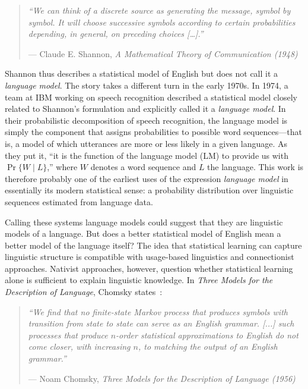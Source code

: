 \begin{quote}
    \small\itshape
    ``We can think of a discrete source as generating the message, symbol by symbol.
    It will choose successive symbols according to certain probabilities depending,
    in general, on preceding choices [\ldots{}].''

    \begin{flushright}
    \normalfont--- Claude E. Shannon, \textit{A Mathematical Theory of Communication (1948)}
    \end{flushright}
\end{quote}
Shannon thus describes a statistical
model of English but does not call it a \textit{language model}.
The story takes a different turn in the early 1970s. In 1974, a team at IBM working 
on speech recognition described a statistical model closely related to Shannon's formulation and explicitly 
called it a \textit{language model}. In their probabilistic decomposition of speech recognition, 
the language model is simply the component that assigns probabilities to possible 
word sequences---that is, a model of which utterances are more or less likely in a given language. 
As they put it, ``it is the function of the language model (LM) to provide us with $\Pr\{W \mid L\}$,'' 
where $W$ denotes a word sequence and $L$ the language. 
This work is therefore probably one of the earliest uses of the expression \textit{language model} 
in essentially its modern statistical sense: a probability distribution over linguistic sequences 
estimated from language data.

Calling these systems language models could suggest that they are
linguistic models of a language. But does a better statistical model of English mean a better model of the language itself?
The idea that statistical learning can capture linguistic structure is compatible 
with usage-based linguistics and connectionist approaches. Nativist approaches, 
however, question whether statistical learning alone is sufficient to explain linguistic knowledge.
In \textit{Three Models for the Description of Language}, Chomsky states~\citep[p.~113]{chomsky1956three}:


\begin{quote}
    \small\itshape
    ``We find that no finite-state Markov process that produces symbols with transition from state to state can serve as an English grammar. 
    [...] such processes that produce $n$-order statistical approximations to English do not come closer, with increasing $n$, to matching the output of an English grammar.''

    \begin{flushright}
    \normalfont--- Noam Chomsky, \textit{Three Models for the Description of Language (1956)}
    \end{flushright}
\end{quote}

